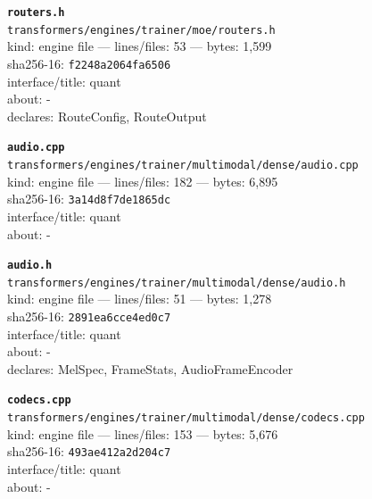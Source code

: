 \noindent\textbf{\texttt{routers.h}}\\
\texttt{transformers/engines/trainer/moe/routers.h}\\
kind: engine file --- lines/files: 53 --- bytes: 1,599\\
sha256-16: \texttt{f2248a2064fa6506}\\
interface/title: quant\\
about: -\\
declares: RouteConfig, RouteOutput\\
\vspace*{6.0pt}
\newpage

\noindent\textbf{\texttt{audio.cpp}}\\
\texttt{transformers/engines/trainer/multimodal/dense/audio.cpp}\\
kind: engine file --- lines/files: 182 --- bytes: 6,895\\
sha256-16: \texttt{3a14d8f7de1865dc}\\
interface/title: quant\\
about: -\\
\vspace*{6.0pt}

\noindent\textbf{\texttt{audio.h}}\\
\texttt{transformers/engines/trainer/multimodal/dense/audio.h}\\
kind: engine file --- lines/files: 51 --- bytes: 1,278\\
sha256-16: \texttt{2891ea6cce4ed0c7}\\
interface/title: quant\\
about: -\\
declares: MelSpec, FrameStats, AudioFrameEncoder\\
\vspace*{6.0pt}

\noindent\textbf{\texttt{codecs.cpp}}\\
\texttt{transformers/engines/trainer/multimodal/dense/codecs.cpp}\\
kind: engine file --- lines/files: 153 --- bytes: 5,676\\
sha256-16: \texttt{493ae412a2d204c7}\\
interface/title: quant\\
about: -\\
\vspace*{6.0pt}

